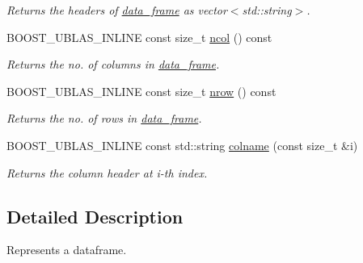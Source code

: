 \begin{DoxyCompactItemize}
\begin{DoxyCompactList}\small\item\em Returns the headers of \hyperlink{classboost_1_1numeric_1_1ublas_1_1data__frame}{data\+\_\+frame} as vector$<$std\+::string$>$. \end{DoxyCompactList}\item 
B\+O\+O\+S\+T\+\_\+\+U\+B\+L\+A\+S\+\_\+\+I\+N\+L\+I\+NE const size\+\_\+t \hyperlink{classboost_1_1numeric_1_1ublas_1_1data__frame_adf7817e6cf0dcc7fa6d892a351b5c9a8}{ncol} () const \hypertarget{classboost_1_1numeric_1_1ublas_1_1data__frame_adf7817e6cf0dcc7fa6d892a351b5c9a8}{}\label{classboost_1_1numeric_1_1ublas_1_1data__frame_adf7817e6cf0dcc7fa6d892a351b5c9a8}

\begin{DoxyCompactList}\small\item\em Returns the no. of columns in \hyperlink{classboost_1_1numeric_1_1ublas_1_1data__frame}{data\+\_\+frame}. \end{DoxyCompactList}\item 
B\+O\+O\+S\+T\+\_\+\+U\+B\+L\+A\+S\+\_\+\+I\+N\+L\+I\+NE const size\+\_\+t \hyperlink{classboost_1_1numeric_1_1ublas_1_1data__frame_a7f773294cbd41d890b5469e2a85abd32}{nrow} () const \hypertarget{classboost_1_1numeric_1_1ublas_1_1data__frame_a7f773294cbd41d890b5469e2a85abd32}{}\label{classboost_1_1numeric_1_1ublas_1_1data__frame_a7f773294cbd41d890b5469e2a85abd32}

\begin{DoxyCompactList}\small\item\em Returns the no. of rows in \hyperlink{classboost_1_1numeric_1_1ublas_1_1data__frame}{data\+\_\+frame}. \end{DoxyCompactList}\item 
B\+O\+O\+S\+T\+\_\+\+U\+B\+L\+A\+S\+\_\+\+I\+N\+L\+I\+NE const std\+::string \hyperlink{classboost_1_1numeric_1_1ublas_1_1data__frame_abda7571a20f64b31d627d3fb2f7956fb}{colname} (const size\+\_\+t \&i)\hypertarget{classboost_1_1numeric_1_1ublas_1_1data__frame_abda7571a20f64b31d627d3fb2f7956fb}{}\label{classboost_1_1numeric_1_1ublas_1_1data__frame_abda7571a20f64b31d627d3fb2f7956fb}

\begin{DoxyCompactList}\small\item\em Returns the column header at i-\/th index. \end{DoxyCompactList}\end{DoxyCompactItemize}


\subsection{Detailed Description}
Represents a dataframe. 

